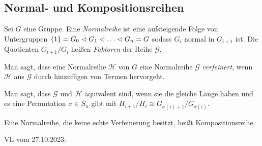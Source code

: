 \documentclass[../main.tex]{subfiles}
\begin{document}
\subsection{Normal- und Kompositionsreihen}

\begin{definition}
Sei $G$ eine Gruppe. Eine \emph{Normalreihe} ist eine aufsteigende Folge von Untergruppen $\trivGO=G_0\nt G_1\nt \dots \nt G_n = G$ sodass $G_i$ normal in $G_{i+1}$ ist. Die Quotienten $G_{i+1}/G_i$ heißen \emph{Faktoren} der Reihe $\mathcal{G}$.

Man sagt, dass eine Normalreihe $\mathcal{H}$ von $G$ eine Normalreihe $\mathcal{G}$ \emph{verfeinert}, wenn $\mathcal{H}$ aus $\mathcal{G}$ durch hinzufügen von Termen hervorgeht.

Man sagt, dass $\mathcal{G}$ und $\mathcal{H}$ äquivalent sind, wenn sie die gleiche Länge haben und es eine Permutation $\sigma \in S_n$ gibt mit $H_{i+1}/H_i \cong G_{\sigma(i)+1}/G_{\sigma(i)}$.

Eine Normalreihe, die keine echte Verfeinerung besitzt, heißt Kompositionsreihe.
\end{definition}

\begin{flushright}
VL vom 27.10.2023:
\end{flushright}
\end{document}
